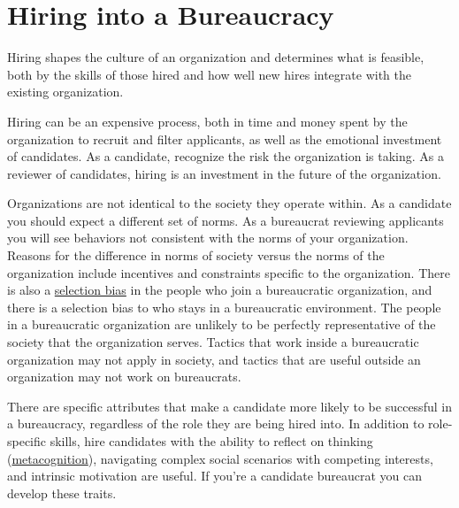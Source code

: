 



\section{Hiring into a Bureaucracy\label{sec:hiring}}


Hiring shapes the culture of an organization and determines what is feasible, both by the skills of those hired and how well new hires integrate with the existing organization. 

Hiring can be an expensive process, both in time and money spent by the organization to recruit and filter applicants, as well as the emotional investment of candidates. %
As a candidate, recognize the risk the organization is taking. 
As a reviewer of candidates, hiring is an investment in the future of the organization. %

Organizations are not identical to the society they operate within. As a candidate you should expect a different set of norms. As a bureaucrat reviewing applicants you will see behaviors not consistent with the norms of your organization. 
Reasons for the difference in norms of society versus the norms of the organization include incentives and constraints specific to the organization. 
There is also a \href{https://en.wikipedia.org/wiki/Selection_bias}{selection bias} in
the people who join a bureaucratic organization, and there is a selection bias to who stays in a bureaucratic environment. 
The people in a bureaucratic organization are unlikely to be perfectly representative of the society that the organization serves. Tactics that work inside a bureaucratic organization may not apply in society, and tactics that are useful outside an organization may not work on bureaucrats. 



There are specific attributes that make a candidate more likely to be successful in a bureaucracy, regardless of the role they are being hired into. 
In addition to role-specific skills, hire candidates with the ability to reflect on 
thinking (\href{https://en.wikipedia.org/wiki/Metacognition}{metacognition}),
\iftoggle{WPinmargin}{\marginpar{$>$Wikipedia: Metacognition}}{}
navigating complex social scenarios with competing interests, and intrinsic motivation are useful. If you're a candidate bureaucrat you can develop these traits. 




